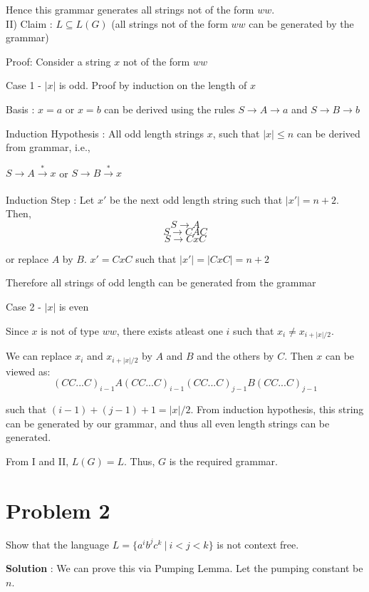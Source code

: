 \documentclass{article}
\begin{document}
    \quad Hence this grammar generates all strings not of the form $ww$. \\
    
    \quad II) Claim : $L \subseteq L(G)$ (all strings not of the form $ww$ can be generated by the grammar)
    
    \quad Proof: Consider a string $x$ not of the form $ww$
     
    \quad Case 1 - $|x|$ is odd. Proof by induction on the length of $x$ 
     
    \qquad Basis : $x=a$ or $x=b$ can be derived using the rules $S \rightarrow A \rightarrow a$ and
    $S \rightarrow B \rightarrow b$
    
    \qquad Induction Hypothesis : All odd length strings $x$, such that $|x| \leq n $ can be derived from grammar, i.e., 
    
    \qquad $S \rightarrow A \xrightarrow[]{*} x$ or $S \rightarrow B \xrightarrow[]{*} x$
    
    \qquad Induction Step : Let $x'$ be the next odd length string such that $|x'|=n+2$. Then,
    $$S \rightarrow A$$
    $$S \rightarrow CAC$$
    $$S \rightarrow CxC$$
    
    \qquad or replace $A$ by $B$. $x' = CxC$ such that $|x'| = |CxC| = n+2$
    
    \qquad Therefore all strings of odd length can be generated from the grammar
    
    \quad Case 2 - $|x|$ is even
    
    \qquad Since $x$ is not of type $ww$, there exists atleast one $i$ such that $x_{i} \neq x_{i+|x|/2}$. 
    
    \qquad We can replace $x_{i}$ and $x_{i+|x|/2}$ by $A$ and $B$ and the others by $C$. Then $x$ can be viewed as:
    $$(CC...C)_{i-1}A(CC...C)_{i-1}(CC...C)_{j-1}B(CC...C)_{j-1}$$
    
    \qquad such that $(i-1)+(j-1)+1 = |x|/2$. From induction hypothesis, this string can be generated by our grammar, and thus all even length strings can be generated.
    
    \quad From I and II, $L(G) = L$. Thus, $G$ is the required grammar.
    
    
    \section*{Problem 2} Show that the language $L = \{a^ib^jc^k~|~i<j<k\}$ is not context free.
    
    \textbf{Solution} : We can prove this via Pumping Lemma. Let the pumping constant be $n$. 
    
\end{document}
